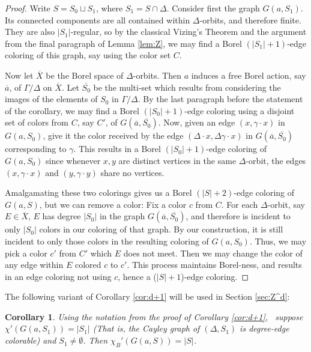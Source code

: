 \documentclass[10pt,a4paper]{article}
\newcommand{\0}{\varnothing}
\newtheorem{corollary}{Corollary}
\begin{document}
\begin{proof}
Write $S = S_0 \sqcup S_1$, where $S_1 = S \cap \Delta$. Consider first the graph $G(a,S_1)$. Its connected components are all contained within $\Delta$-orbits, and therefore finite. They are also $|S_1|$-regular, so by the classical Vizing's Theorem and the argument from the final paragraph of Lemma \ref{lem:Z}, we may find a Borel $(|S_1|+1)$-edge coloring of this graph, say using the color set $C$.

Now let $\overline{X}$ be the Borel space of $\Delta$-orbits. Then $a$ induces a free Borel action, say $\overline{a}$, of $\Gamma/\Delta$ on $\overline{X}$. Let $\overline{S_0}$ be the multi-set which results from considering the images of the elements of $S_0$ in $\Gamma/\Delta$. By the last paragraph before the statement of the corollary, we may find a Borel $(|S_0|+1)$-edge coloring using a disjoint set of colors from $C$, say $C'$, of $G(\overline{a},\overline{S_0})$. Now, given an edge $(x,\gamma\cdot x)$ in $G(a,S_0)$, give it the color received by the edge $(\Delta \cdot x, \Delta \gamma \cdot x)$ in $G(\overline{a},\overline{S_0})$ corresponding to $\gamma$. This results in a Borel $(|S_0|+1)$-edge coloring of $G(a,S_0)$ since whenever $x,y$ are distinct vertices in the same $\Delta$-orbit, the edges $(x,\gamma \cdot x)$ and $(y,\gamma \cdot y)$ share no vertices. 

Amalgamating these two colorings gives us a Borel $(|S|+2)$-edge coloring of $G(a,S)$, but we can remove a color: Fix a color $c$ from $C$. For each $\Delta$-orbit, say $E \in \overline{X}$, $E$ has degree $|S_0|$ in the graph $G(\overline{a},\overline{S_0})$, and therefore is incident to only $|S_0|$ colors in our coloring of that graph. By our construction, it is still incident to only those colors in the resulting coloring of $G(a,S_0)$. Thus, we may pick a color $c'$ from $C'$ which $E$ does not meet. Then we may change the color of any edge within $E$ colored $c$ to $c'$. This process maintains Borel-ness, and results in an edge coloring not using $c$, hence a ($|S|+1$)-edge coloring.
\end{proof}

The following variant of Corollary \ref{cor:d+1} will be used in Section \ref{sec:Z^d}:

\begin{corollary}\label{cor:d}
Using the notation from the proof of Corollary \ref{cor:d+1}, \ suppose $\chi'(G(a,S_1)) = |S_1|$ (That is, the Cayley graph of $(\Delta,S_1)$ is degree-edge colorable) and $S_1 \neq \emptyset$. Then $\chi_B'(G(a,S)) = |S|$.
\end{corollary}
\end{document}
